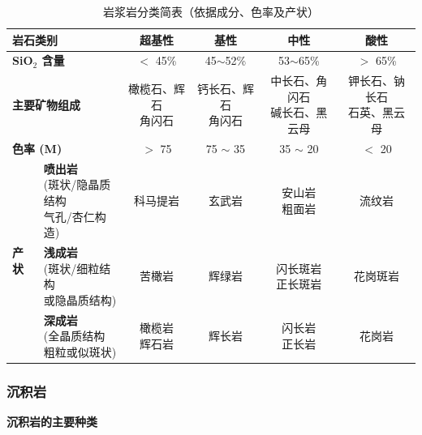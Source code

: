 \documentclass[12pt,a4paper]{article}
\begin{document}
	
	\begin{table}[htbp]
		\centering
		\caption{岩浆岩分类简表（依据成分、色率及产状）}
		\label{tab:igneous_rocks}
		\small %
		\renewcommand{\arraystretch}{1.5} %
		\begin{tabular}{llcccc}
			\toprule
			\multicolumn{2}{l}{\textbf{岩石类别}} & \textbf{超基性} & \textbf{基性} & \textbf{中性} & \textbf{酸性} \\
			\midrule
			\multicolumn{2}{l}{\textbf{SiO$_2$ 含量}} & $<$ 45\% & 45$\sim$52\% & 53$\sim$65\% & $>$ 65\% \\
			\midrule
			\multicolumn{2}{l}{\textbf{主要矿物组成}} & \makecell[l]{橄榄石、辉石\\角闪石} & \makecell[l]{钙长石、辉石\\角闪石} & \makecell[l]{中长石、角闪石\\碱长石、黑云母} & \makecell[l]{钾长石、钠长石\\石英、黑云母} \\
			\midrule
			\multicolumn{2}{l}{\textbf{色率 (M)}} & $>$ 75 & 75 $\sim$ 35 & 35 $\sim$ 20 & $<$ 20 \\
			\midrule
			\multirow{6}{*}{\textbf{产状}} & \makecell[l]{\textbf{喷出岩}\\\scriptsize (斑状/隐晶质结构\\\scriptsize 气孔/杏仁构造)} & 科马提岩 & 玄武岩 & \makecell{安山岩\\粗面岩} & 流纹岩 \\
			\cmidrule{2-6}
			& \makecell[l]{\textbf{浅成岩}\\\scriptsize (斑状/细粒结构\\\scriptsize 或隐晶质结构)} & 苦橄岩 & 辉绿岩 & \makecell{闪长斑岩\\正长斑岩} & 花岗斑岩 \\
			\cmidrule{2-6}
			& \makecell[l]{\textbf{深成岩}\\\scriptsize (全晶质结构\\\scriptsize 粗粒或似斑状)} & \makecell{橄榄岩\\辉石岩} & 辉长岩 & \makecell{闪长岩\\正长岩} & 花岗岩 \\
			\bottomrule
		\end{tabular}
	\end{table}
	
	\subsubsection{沉积岩}
	\textbf{沉积岩的主要种类}
	
\end{document}
